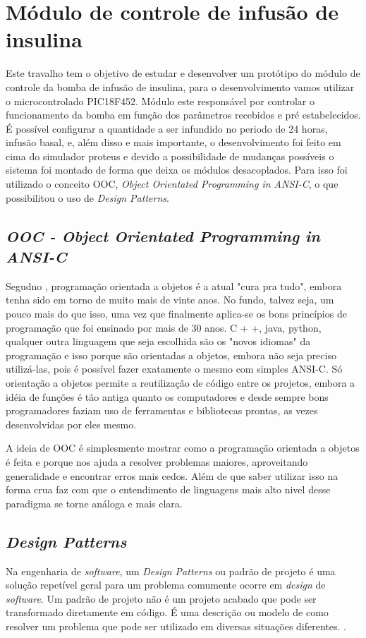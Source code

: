 \chapter{Módulo de controle de infusão de insulina}
Este travalho tem o objetivo de estudar e desenvolver um protótipo do módulo de controle da bomba de infusão de insulina, para o desenvolvimento vamos utilizar o microcontrolado PIC18F452. Módulo este responsável por controlar o funcionamento da bomba em função dos parâmetros recebidos e pré estabelecidos. É possível configurar a quantidade a ser infundido no periodo de 24 horas, infusão basal, e, além disso e mais importante, o desenvolvimento foi feito em cima do simulador proteus e devido a possibilidade de mudanças possíveis o sistema foi montado de forma que deixa os módulos desacoplados. Para isso foi utilizado o conceito OOC, \emph{Object Orientated Programming in ANSI-C}, o que possibilitou o uso de \emph{Design Patterns}.

\section{\emph{OOC - \emph{Object Orientated Programming in ANSI-C}}}
Segudno \cite{schreiner1993object}, programação orientada a objetos é a atual "cura pra tudo", embora tenha sido em torno de muito mais de vinte anos. No fundo, talvez seja, um pouco mais do que isso, uma vez que finalmente aplica-se os bons princípios de programação que foi ensinado por mais de 30 anos. C + +, java, python, qualquer outra linguagem que seja escolhida são os "novos idiomas" da programação e isso porque são orientadas a objetos, embora não seja preciso utilizá-las, pois é possível fazer exatamente o mesmo com simples ANSI-C. Só orientação a objetos permite a reutilização de código entre os projetos, embora a idéia de funções é tão antiga quanto os computadores e desde sempre bons programadores faziam uso de ferramentas e bibliotecas prontas, as vezes desenvolvidas por eles mesmo.

A ideia de OOC é simplesmente mostrar como a programação orientada a objetos é feita e porque nos ajuda a resolver problemas maiores, aproveitando generalidade e encontrar erros mais cedos. Além de que saber utilizar isso na forma crua faz com que o entendimento de linguagens mais alto nivel desse paradigma se torne análoga e mais clara.

\section{\emph{Design Patterns}}
Na engenharia de \emph{software}, um \emph{Design Patterns} ou padrão de projeto é uma solução repetível geral para um problema comumente ocorre em \emph{design} de \emph{software}. Um padrão de projeto não é um projeto acabado que pode ser transformado diretamente em código. É uma descrição ou modelo de como resolver um problema que pode ser utilizado em diversas situações diferentes. \cite{shalloway2004design}.

